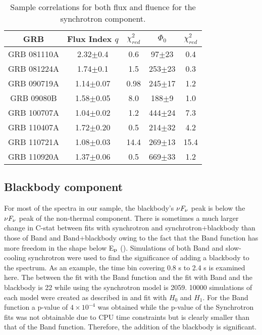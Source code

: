 \begin{table}[h!]
\centering
\begin{tabular}{c | c c c c}
GRB & Flux Index $q$ & $\chi^2_{red}$ & $\Phi_0$ & $\chi^2_{red}$ \\ 
\hline \hline
GRB 081110A & 2.32$\pm$0.4 & 0.6 & 97$\pm$23 & 0.4 \\ 

GRB 081224A & 1.74$\pm$0.1 & 1.5 & 253$\pm$23 & 0.3 \\ 

GRB 090719A & 1.14$\pm$0.07 & 0.98 & 245$\pm$17 & 1.2\\

GRB 09080B & 1.58$\pm$0.05 & 8.0 & 188$\pm$9 & 1.0 \\ 

GRB 100707A & 1.04$\pm$0.02 & 1.2 & 444$\pm$24 & 7.3 \\ 

GRB 110407A & 1.72$\pm$0.20 & 0.5 & 214$\pm$32 & 4.2 \\ 

GRB 110721A & 1.08$\pm$0.03 & 14.4 & 269$\pm$13 & 15.4 \\ 

GRB 110920A & 1.37$\pm$0.06 & 0.5 & 669$\pm$33 & 1.2 \\ 



\end{tabular}
\caption{Sample correlations for both flux and fluence for the synchrotron component.}
\label{tab:cor}
\end{table}




\subsection{Blackbody component}
\label{sec:results:bb}
For most of the spectra in our sample, the blackbody's $\nu F_{\nu}$ peak is
below the $\nu F_{\nu}$ peak of the non-thermal component. There is sometimes
a much larger change in C-stat between fits with synchrotron and
synchrotron+blackbody than those of Band and Band+blackbody owing to
the fact that the Band function has more freedom in the shape below
E$_{\rm p}$ (). Simulations of both
Band and slow-cooling synchrotron were used to find the significance
of adding a blackbody to the spectrum. As an example, the time bin
covering 0.8 s to 2.4 s is examined here. The \dcstat between the fit
with the Band function and the fit with Band and the blackbody is 22
while \dcstat using the synchrotron model is 2059. 10000 simulations
of each model were created as described in 
and fit with $H_0$ and $H_1$. For the Band function a p-value of
$4\times 10^{-4}$ was obtained while the p-value of the Synchrotron
fits was not obtainable due to CPU time constraints but is clearly
smaller than that of the Band function. Therefore, the addition of the
blackbody is significant.

